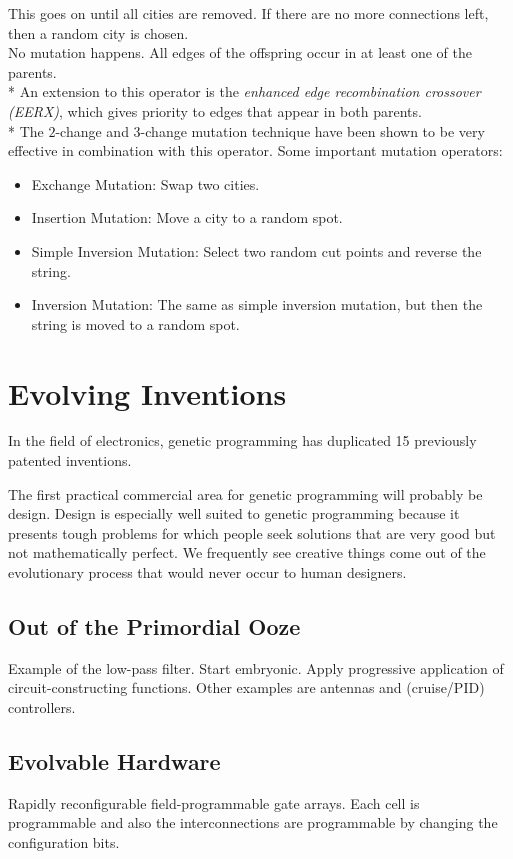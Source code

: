 \documentclass[12pt]{book}
\begin{document}
\begin{itemize}
\begin{itemize}
\end{itemize}
This goes on until all cities are removed. If there are no more connections left, then a random city is chosen.\\
No mutation happens. All edges of the offspring occur in at least one of the parents.\\*
An extension to this operator is the \textit{enhanced edge recombination crossover (EERX)}, which gives priority to edges that appear in both parents.\\*
The $2$-change and $3$-change mutation technique have been shown to be very effective in combination with this operator. Some important mutation operators:
\begin{itemize}
\item Exchange Mutation: Swap two cities.
\item Insertion Mutation: Move a city to a random spot.
\item Simple Inversion Mutation: Select two random cut points and reverse the string.
\item Inversion Mutation: The same as simple inversion mutation, but then the string is moved to a random spot.
\end{itemize}
\end{itemize}
\clearpage

\appendix
\chapter{Evolving Inventions}
In the field of electronics, genetic programming has duplicated 15 previously patented inventions.

The first practical commercial area for genetic programming will probably be design. Design is especially well suited to genetic programming because it presents tough problems for which people seek solutions that are very good but not mathematically perfect. We frequently see creative things come out of the evolutionary process that would never occur to human designers.

\section{Out of the Primordial Ooze}
Example of the low-pass filter. Start embryonic. Apply progressive application of circuit-constructing functions. Other examples are antennas and (cruise/PID) controllers.

\section{Evolvable Hardware}
Rapidly reconfigurable field-programmable gate arrays. Each cell is programmable and also the interconnections are programmable by changing the configuration bits.
\end{document}
